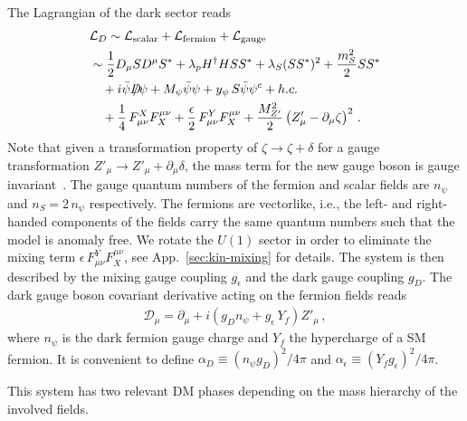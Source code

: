 \documentclass[aps,prd,twocolumn,preprintnumbers,superscriptaddress,nobibnotes,floatfix,longbibliography]{revtex4-1}
\begin{document}
The Lagrangian of the dark sector reads 
\begin{align}
\label{eqn:dmmodel}
&  \mathcal L_D \sim  \mathcal{L}_{\rm scalar} +   \mathcal{L}_{\rm fermion} +   \mathcal{L}_{\rm gauge}   \\
&  \sim \frac{1}{2} D_\mu S D^\mu S^* + \lambda_p  H^\dagger H S S^* + \lambda_S (S S^*)^2 + \frac{m_S^2}{2} S S^*  \nonumber \\ \nonumber
 &\quad  + i \bar{\psi} D \!\!\!\! / \psi + M_\psi \bar{\psi} \psi  + y_\psi \, S \bar{\psi} \psi^c  + h.c. \nonumber \\ 
&  \quad + \frac{1}{4}\, F^X_{\mu \nu } F_X^{\mu \nu } + \frac{\epsilon}{2}\, F^Y_{\mu \nu } F_X^{\mu \nu } + \frac{M_{Z'}^2}{2} \left( Z'_{\mu} - \partial_\mu \zeta \right)^2\nonumber\,.
\end{align}
Note that given a transformation property of $\zeta \rightarrow \zeta + \delta$ for a gauge transformation $Z'_{\mu} \rightarrow Z'_{\mu}+ \partial_\mu \delta$, the mass term for the new gauge boson is gauge invariant~\cite{Stueckelberg:1900zz}.
The gauge quantum numbers of the fermion and scalar fields are $n_\psi$ and $n_S = 2 \,n_\psi$ respectively.
The fermions are vectorlike, i.e., the left- and right-handed components of the fields carry the same quantum numbers such that the model is anomaly free.
We rotate the $U(1)$ sector in order to eliminate the mixing term $\epsilon\, F^Y_{\mu \nu } F_X^{\mu \nu }$, see App.~\ref{sec:kin-mixing} for details.
The system is then described by the mixing gauge coupling $g_\epsilon$ and the dark gauge coupling $g_D$.
The dark gauge boson covariant derivative acting on the fermion fields reads
\begin{align}
\label{eq:cov-der}
\mathcal{D}_{\mu} = \partial_\mu + i \left(g_D  n_\psi  + g_\epsilon  \,Y_f  \right) Z'_{\mu}\,,
\end{align}
where $n_\psi$ is the dark fermion gauge charge and $Y_f$ the hypercharge of a SM fermion.
 It is convenient to define $\alpha_D \equiv (n_\psi g_D )^2/ 4 \pi$ and  $\alpha_{\epsilon} \equiv (Y_f  g_\epsilon  )^2/ 4 \pi$.

This system has two relevant DM phases depending on the mass hierarchy of the involved fields. 
\end{document}
